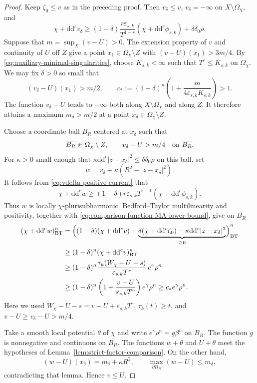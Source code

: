 \documentclass[oneside,english,letterpaper]{amsart}
\numberwithin{equation}{section}
\theoremstyle{plain}
\theoremstyle{definition}
\theoremstyle{remark}
\renewcommand{\d}{\mathrm{d}}
\newcommand{\ddc}{\d\d^c}
\begin{document}
\begin{proof}
	Keep $\zeta_0\leq v$ as in the preceding proof. Then
	$v_\delta\leq v$, $v_\delta=-\infty$ on
	$X\setminus\Omega_\chi$, and
	\begin{equation}
		\label{eq:vdelta-positive-current}
		\chi+\ddc v_\delta
		\geq(1-\delta)\frac{r\varepsilon_{s,k}}{T^{1-r}}
		(\chi+\ddc\phi_{s,k})+\delta\delta_0\rho.
	\end{equation}
	Suppose that $m=\sup_X(v-U)>0$. The extension property of $v$ and
	continuity of $U$ off $Z$ give a point
	$x_1\in\Omega_\chi\setminus Z$ with $(v-U)(x_1)>3m/4$.
	By \eqref{eq:auxiliary-minimal-singularities}, choose $K_{s,k}<\infty$
	such that $T^r\leq K_{s,k}$ on $\Omega_\chi$. We may fix
	$\delta>0$ so small that
	$$
	(v_\delta-U)(x_1)>m/2,
	\qquad
	c_*:=(1-\delta)^n
	\left(1+\frac{m}{4\varepsilon_{s,k} K_{s,k}}\right)>1.
	$$
	The function $v_\delta-U$ tends to $-\infty$ both along
	$X\setminus\Omega_\chi$ and along $Z$. It therefore attains a
	maximum $m_\delta>m/2$ at a point
	$x_\delta\in\Omega_\chi\setminus Z$.
	
	Choose a coordinate ball $B_R$ centered at $x_\delta$ such that
	$$
	\overline{B_R}\Subset\Omega_\chi\setminus Z,
	\qquad
	v_\delta-U>m/4\quad\hbox{on }\overline{B_R}.
	$$
	For $\kappa>0$ small enough that
	$\kappa\ddc|z-x_\delta|^2\leq\delta\delta_0\rho$ on this ball, set
	$$
	w=v_\delta+\kappa(R^2-|z-x_\delta|^2).
	$$
	It follows from \eqref{eq:vdelta-positive-current} that
	\[
	\chi+\ddc w\geq(1-\delta)r\varepsilon_{s,k} T^{r-1}
	(\chi+\ddc\phi_{s,k}).
	\]
	Thus $w$ is locally $\chi$-plurisubharmonic.
Bedford--Taylor multilinearity and positivity, together with
\eqref{eq:comparison-function-MA-lower-bound}, give on $B_R$
\begin{align*}
	(\chi+\ddc w)^n_{\mathrm{BT}}
	&=\Bigl((1-\delta)(\chi+\ddc v)
	+\underbrace{\delta(\chi+\ddc\zeta_0)
	-\kappa\ddc|z-x_\delta|^2}_{\geq0}\Bigr)^n_{\mathrm{BT}}\\
	&\geq(1-\delta)^n(\chi+\ddc v)^n_{\mathrm{BT}}\\
	&\geq(1-\delta)^n
	\frac{\tau_k(W_\chi-U-s)}{\varepsilon_{s,k}T^r}\,
	e^\gamma\rho^n\\
	&\geq(1-\delta)^n
	\left(1+\frac{v-U}{\varepsilon_{s,k}T^r}\right)
	e^\gamma\rho^n
	\geq c_*e^\gamma\rho^n.
\end{align*}
Here we used $W_\chi-U-s=v-U+\varepsilon_{s,k}T^r$,
$\tau_k(t)\geq t$, and $v-U\geq v_\delta-U>m/4$.
	
	Take a smooth local potential $\theta$ of $\chi$ and write
	$e^\gamma\rho^n=g\beta^n$ on $B_R$. The function $g$ is nonnegative
	and continuous on $\overline{B_R}$. The functions $w+\theta$ and
	$U+\theta$ meet the hypotheses of
	Lemma~\ref{lem:strict-factor-comparison}. On the other hand,
	$$
	(w-U)(x_\delta)=m_\delta+\kappa R^2,
	\qquad
	\max_{\partial B_R}(w-U)\leq m_\delta,
	$$
	contradicting that lemma. Hence $v\leq U$.
\end{proof}
\end{document}
